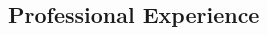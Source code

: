 \documentclass[margin,line, 12pt]{res}
\newenvironment{list2}{
  \begin{list}{$\bullet$}{%
      \setlength{\itemsep}{0.0in}
      \setlength{\parsep}{0in} \setlength{\parskip}{0in}
      \setlength{\topsep}{0.0in} \setlength{\partopsep}{0in}
      \setlength{\leftmargin}{0.2in}}}{\end{list}}
\begin{document}
\begin{spacing}{1.0}
\begin{resume}
\section{Professional \newline Experience}
%

\end{resume}
\end{spacing}
\end{document}
